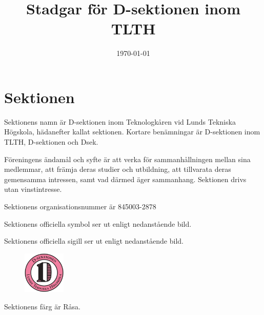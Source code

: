 \documentclass[stadgar]{dsekprotokoll}
\begin{document}
\title{Stadgar för D-sektionen inom TLTH}
\date{\today}

\maketitle

\section{Sektionen}

\begin{stadgeavsnitt}


Sektionens namn är D-sektionen inom Teknologkåren vid Lunds Tekniska Högskola, hädanefter kallat sektionen. Kortare benämningar är D-sektionen inom TLTH, D-sektionen och Dsek.


Föreningens ändamål och syfte är att verka för sammanhållningen mellan sina
medlemmar, att främja deras studier och utbildning, att tillvarata deras
gemensamma intressen, samt vad därmed äger sammanhang. Sektionen drivs utan
vinstintresse.

Sektionens organisationsnummer är 845003-2878\\


Sektionens officiella symbol ser ut enligt nedanstående bild.

\tthdump{\Dsymbol[10mm]}


Sektionens officiella sigill ser ut enligt nedanstående bild.
\begin{figure}[htb]
\begin{adjustwidth}{5cm}{0cm}
\includegraphics[height=20mm,width=20 mm]{sigill.pdf}
\end{adjustwidth}
\end{figure}



Sektionens färg är Råsa.



\end{stadgeavsnitt}
\end{document}
